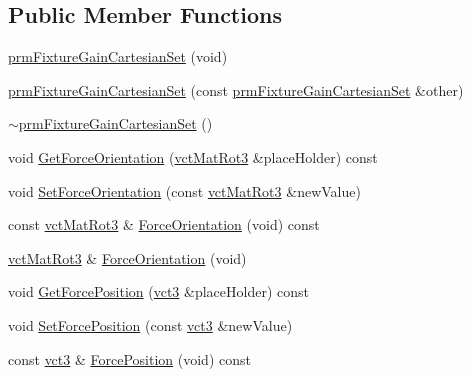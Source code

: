 \subsection*{Public Member Functions}
\begin{DoxyCompactItemize}
\item 
\hyperlink{classprm_fixture_gain_cartesian_set_aeabab7244ddacb31ebe44b6e3a22af09}{prm\-Fixture\-Gain\-Cartesian\-Set} (void)
\item 
\hyperlink{classprm_fixture_gain_cartesian_set_a4748bbff8176a507126ea217e11220a6}{prm\-Fixture\-Gain\-Cartesian\-Set} (const \hyperlink{classprm_fixture_gain_cartesian_set}{prm\-Fixture\-Gain\-Cartesian\-Set} \&other)
\item 
\hyperlink{classprm_fixture_gain_cartesian_set_a8ad0c5ddfae4d37f371c832932252b36}{$\sim$prm\-Fixture\-Gain\-Cartesian\-Set} ()
\item 
void \hyperlink{classprm_fixture_gain_cartesian_set_a08bdb2564863a931c0c8f00f9d44e6ca}{Get\-Force\-Orientation} (\hyperlink{vct_transformation_types_8h_a30fe23c1d38748a9b8f2fb9bb2471382}{vct\-Mat\-Rot3} \&place\-Holder) const 
\item 
void \hyperlink{classprm_fixture_gain_cartesian_set_ace97a49aa55a292d51fd4ac1ff9a40a1}{Set\-Force\-Orientation} (const \hyperlink{vct_transformation_types_8h_a30fe23c1d38748a9b8f2fb9bb2471382}{vct\-Mat\-Rot3} \&new\-Value)
\item 
const \hyperlink{vct_transformation_types_8h_a30fe23c1d38748a9b8f2fb9bb2471382}{vct\-Mat\-Rot3} \& \hyperlink{classprm_fixture_gain_cartesian_set_a6e30c631f54383385c25bbc261c3ae78}{Force\-Orientation} (void) const 
\item 
\hyperlink{vct_transformation_types_8h_a30fe23c1d38748a9b8f2fb9bb2471382}{vct\-Mat\-Rot3} \& \hyperlink{classprm_fixture_gain_cartesian_set_a359d932fa58baff0a1ba4bd052ff3ec1}{Force\-Orientation} (void)
\item 
void \hyperlink{classprm_fixture_gain_cartesian_set_a6794ab2c78f5fae4589689dc8bbd2718}{Get\-Force\-Position} (\hyperlink{vct_fixed_size_vector_types_8h_a3af82acdbf4eeb73c551909240b106ea}{vct3} \&place\-Holder) const 
\item 
void \hyperlink{classprm_fixture_gain_cartesian_set_a4bde1be2d9fff2516fb4d8eeb232911d}{Set\-Force\-Position} (const \hyperlink{vct_fixed_size_vector_types_8h_a3af82acdbf4eeb73c551909240b106ea}{vct3} \&new\-Value)
\item 
const \hyperlink{vct_fixed_size_vector_types_8h_a3af82acdbf4eeb73c551909240b106ea}{vct3} \& \hyperlink{classprm_fixture_gain_cartesian_set_a29e5d95b17dcc05c6cdc45e3491d1237}{Force\-Position} (void) const 

\end{DoxyCompactItemize}
